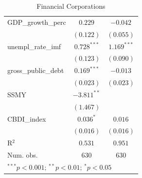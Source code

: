\begin{table} [t]
\begin{minipage}{0.5\textwidth}
{\begin{tabular}{l c c}
GDP\_growth\_perc   & $0.229$        & $-0.042$       \\
                    & $(0.122)$      & $(0.055)$      \\
unempl\_rate\_imf   & $0.728^{***}$  & $1.169^{***}$  \\
                    & $(0.123)$      & $(0.090)$      \\
gross\_public\_debt & $0.169^{***}$  & $-0.013$       \\
                    & $(0.023)$      & $(0.023)$      \\
SSMY                & $-3.811^{**}$  &                \\
                    & $(1.467)$      &                \\
CBDI\_index         & $0.036^{*}$    & $0.016$        \\
                    & $(0.016)$      & $(0.016)$      \\
\hline
R$^2$               & $0.531$        & $0.951$        \\
Num. obs.           & $630$          & $630$          \\
\hline
\multicolumn{3}{l}{\scriptsize{$^{***}p<0.001$; $^{**}p<0.01$; $^{*}p<0.05$}}
\end{tabular}}

 \end{minipage}
\hfillx
        
\begin{minipage}{0.5\textwidth}
 \centering
            
\caption{Financial Corporations}



\end{minipage}
\end{table}
